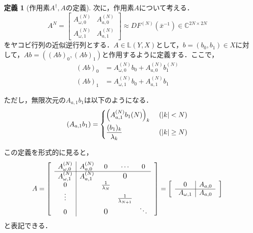 \documentclass[11pt,a4paper]{jsarticle}
\theoremstyle{definition}
\newtheorem{dfn}{定義}
\begin{document}
\begin{dfn}[作用素$A^\dagger,A$の定義]
  次に，$作用素A$について考える．
  \begin{equation*}
    A^{N} = \begin{bmatrix}
      A_{\omega,0}^{(N)} & A_{a,0}^{(N)} \\
      A_{\omega,1}^{(N)} & A_{a,1}^{(N)}
    \end{bmatrix}
    \approx DF^{(N)} \left(\bar{x}^{-1}\right) \in \mathbb{C}^{2N\times 2N}
  \end{equation*}
  をヤコビ行列の近似逆行列とする．$A\in\mathbb{L}(Y,X)$として，$b=\left(b_0,b_1\right)\in X$に対して，$Ab=\left((Ab)_0,(Ab)_1\right)$と作用するように定義する．ここで，
  \begin{align*}
    (Ab)_0 & = A_{\omega,0}^{(N)}b_0 + A_{a,0}^{(N)} b_1^{(N)} \\
    (Ab)_1 & = A_{\omega,1}^{(N)}b_0 + A_{a,1}^{(N)} b_1
  \end{align*}

  ただし，無限次元の$A_{a,1}b_1$は以下のようになる．
  \begin{equation*}
    \left(A_{a,1}b_1\right)=\begin{dcases}
      \left(A_{a,1}^{(N)}b_1{(N)}\right)_k & \ (|k|<N)     \\
      \frac{(b_1)_k}{\lambda_k}            & \ (|k|\geq N)
    \end{dcases}
  \end{equation*}

  この定義を形式的に見ると，
  \begin{equation*}
    A =
    \begin{bmatrix}
       & \multicolumn{1}{c|}{A_{\omega,0}^{(N)}} & A_{a,0}^{(N)} & 0                   & \cdots                  & 0      & \\ \cline{2-6}
       & \multicolumn{1}{c|}{A_{\omega,1}^{(N)}} & A_{a,1}^{(N)} &                     & \text{\large{0}}        &        & \\
       & \multicolumn{1}{c|}{0}                  &               & \frac{1}{\lambda_N} &                         &        & \\
       & \multicolumn{1}{c|}{\vdots}             &               &                     & \frac{1}{\lambda_{N+1}} &        & \\
       & \multicolumn{1}{c|}{0}                  &               & \text{\large{0}}    &                         & \ddots & \\
    \end{bmatrix}
    =
    \begin{bmatrix}
       & \multicolumn{1}{c|}{0}            & A_{a,0} & \\ \cline{2-3}
       & \multicolumn{1}{c|}{A_{\omega,1}} & A_{a,0} &
    \end{bmatrix}
  \end{equation*}
  と表記できる．
\end{dfn}
\end{document}
